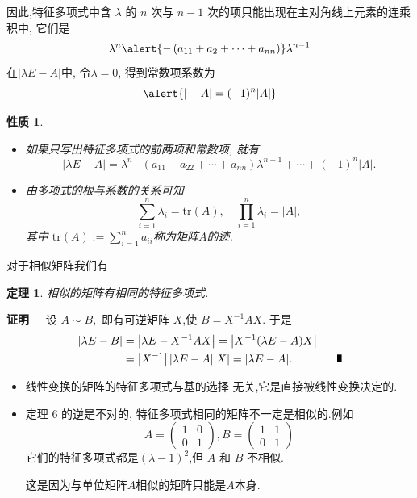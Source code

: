 \documentclass[13pt]{beamer}
\newtheorem{thm}{定理}
\newtheorem*{prop}{性质}
\def\pf{{\bf 证明~~ }}
\begin{document}
\begin{frame}
\small{
 因此,特征多项式中含 $\lambda$ 的 $n$ 次与 $n-1$ 次的项只能出现在主对角线上元素的连乘积中, 它们是
\[
\lambda^{n}\alert{-\left(a_{11}+a_{2}+\dots+a_{nn}\right)} \lambda^{n-1}
\]
在$|\lambda {E}-{A}|$中, 令$\lambda=0$, 得到常数项系数为 $$\alert{|-{A}|=(-1)^n|A|}$$
\begin{prop}
	\begin{itemize}
		\item 如果只写出特征多项式的前两项和常数项, 就有
		$$|\lambda E-A|= \lambda^{n}{-\left(a_{11}+a_{22}+\cdots+a_{nn}\right)} \lambda^{n-1}+ \cdots+{(-1)^n|A|}.$$
		\item 由多项式的根与系数的关系可知
		\[
		\sum_{i=1}^{n} \lambda_{i}=\mbox{tr}({A}), \quad \prod_{i=1}^{n} \lambda_{i}=|{A}|, 
		\]
		其中
		$\mbox{tr}({A}):=\sum_{i=1}^{n} {a}_{i i}$称为矩阵$A$的迹.
	\end{itemize}
\end{prop} }
\end{frame}

\begin{frame}
对于相似矩阵我们有 
\begin{thm}
相似的矩阵有相同的特征多项式.
\end{thm}
\pf 设 ${A} \sim {B},$ 即有可逆矩阵 ${X}$,使 ${B}={X}^{-1} {A X} .$ 于是
\[
\begin{aligned}
|\lambda {E}-{B}| &=\left|\lambda {E}-{X}^{-1} {A} {X}\right|=\left|{X}^{-1}(\lambda {E}-{A}) {X}\right| \\
&=\left|{X}^{-1}\right||\lambda {E}-{A}||{X}|=|\lambda {E}-{A}|.
\qquad \qquad  \hfill{\rule{4pt}{7pt}}
\end{aligned}
\]
\begin{itemize}
\item 线性变换的矩阵的特征多项式与基的选择
无关,它是直接被线性变换决定的.
\item 定理 6 的逆是不对的, 特征多项式相同的矩阵不一定是相似的.例如
\[
{A}=\left(\begin{array}{ll}
1 & 0 \\
0 & 1
\end{array}\right), {B}=\left(\begin{array}{ll}
1 & 1 \\
0 & 1
\end{array}\right)
\]
它们的特征多项式都是$( \lambda-1 )^{2}$,但 ${A}$ 和 ${B}$ 不相似.

这是因为与单位矩阵$A$相似的矩阵只能是$A$本身.
\end{itemize}

\end{frame}
\end{document}
